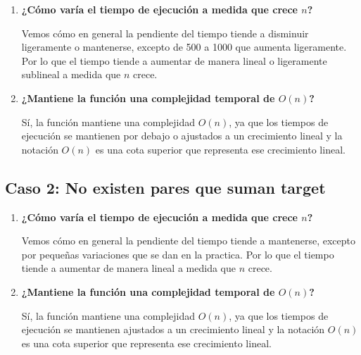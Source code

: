 \documentclass{article}
\begin{document}
\vspace{0.5cm}

\begin{enumerate}
    \item \textbf{¿Cómo varía el tiempo de ejecución a medida que crece $n$?}

    \vspace{0.5cm}
    
    Vemos cómo en general la pendiente del tiempo tiende a disminuir ligeramente o mantenerse, excepto de 500 a 1000 que aumenta ligeramente. Por lo que el tiempo tiende a aumentar de manera lineal o ligeramente sublineal a medida que $n$ crece.
    
\vspace{0.5cm}

    \item \textbf{¿Mantiene la función una complejidad temporal de $O(n)$?}
    \vspace{0.5cm}
    
    Sí, la función mantiene una complejidad $O(n)$, ya que los tiempos de ejecución se mantienen por debajo o ajustados a un crecimiento lineal y la notación $O(n)$ es una cota superior que representa ese crecimiento lineal.
\end{enumerate}

\vspace{1.5cm}

\subsection{Caso 2: No existen pares que suman target}

\vspace{0.5cm}

\begin{enumerate}
    \item \textbf{¿Cómo varía el tiempo de ejecución a medida que crece $n$?}

    \vspace{0.5cm}
    
    Vemos cómo en general la pendiente del tiempo tiende a mantenerse, excepto por pequeñas variaciones que se dan en la practica. Por lo que el tiempo tiende a aumentar de manera lineal a medida que $n$ crece.

    \item \textbf{¿Mantiene la función una complejidad temporal de $O(n)$?}
    \vspace{0.5cm}
    
    Sí, la función mantiene una complejidad $O(n)$, ya que los tiempos de ejecución se mantienen ajustados a un crecimiento lineal y la notación $O(n)$ es una cota superior que representa ese crecimiento lineal.
\end{enumerate}
\end{document}
